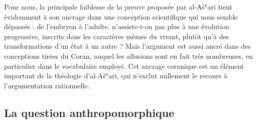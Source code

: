 Pour nous, la principale faiblesse de la preuve proposée par al-Ašʿarī
tient évidemment à son ancrage dans une conception scientifique qui nous
semble dépassée : de l'embryon à l'adulte, n'assiste-t-on pas plus à une
évolution progressive, inscrite dans les caractères mêmes du vivant,
plutôt qu'à des transformations d'un état à un autre ? Mais l'argument
est aussi ancré dans des conceptions tirées du Coran, auquel les
allusions sont en fait très nombreuses, en particulier dans le
vocabulaire employé. Cet ancrage coranique est un élément important de
la théologie d'al-Ašʿarī, qui n'exclut nullement le recours à
l'argumentation rationnelle.

 
  \subsection{La question anthropomorphique}
 

